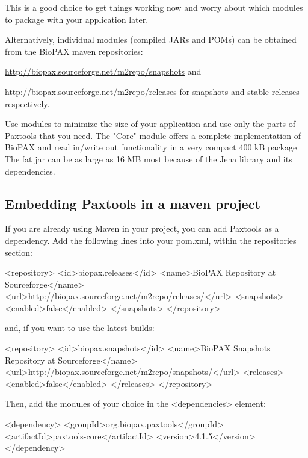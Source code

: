 \documentclass{tufte-book}
\begin{document}
This is a good choice to get things working now and worry about which modules to package with your application later.

Alternatively, individual modules (compiled JARs and POMs) can be obtained from the BioPAX maven repositories:
	
	\url{http://biopax.sourceforge.net/m2repo/snapshots} and 

\url{http://biopax.sourceforge.net/m2repo/releases}
for snapshots and stable releases respectively. 

Use modules to minimize the size of your application and use only the parts of Paxtools that you need. The "Core" module offers a complete implementation of BioPAX and read in/write out functionality in a very compact 400 kB package The fat jar can be as large as 16 MB most because of the Jena library and its dependencies.


\subsection{Embedding Paxtools in a maven project}

If you are already using Maven in your project, you can add Paxtools as a dependency.
Add the following lines into your pom.xml, within the repositories section:

\begin{xmlcode}
<repository>
  <id>biopax.releases</id>
  <name>BioPAX Repository at Sourceforge</name>
  <url>http://biopax.sourceforge.net/m2repo/releases/</url>
  <snapshots>
   <enabled>false</enabled>
  </snapshots>
</repository>
\end{xmlcode}

and, if you want to use the latest builds:

\begin{xmlcode}
<repository>
  <id>biopax.snapshots</id>
  <name>BioPAX Snapshots Repository at Sourceforge</name>
  <url>http://biopax.sourceforge.net/m2repo/snapshots/</url>
  <releases>
   <enabled>false</enabled>
  </releases>
 </repository>
\end{xmlcode}

Then, add the modules of your choice in the <dependencies> element:

\begin{xmlcode}
<dependency>
  <groupId>org.biopax.paxtools</groupId>
  <artifactId>paxtools-core</artifactId>
  <version>4.1.5</version>
 </dependency>
\end{xmlcode}
\end{document}
